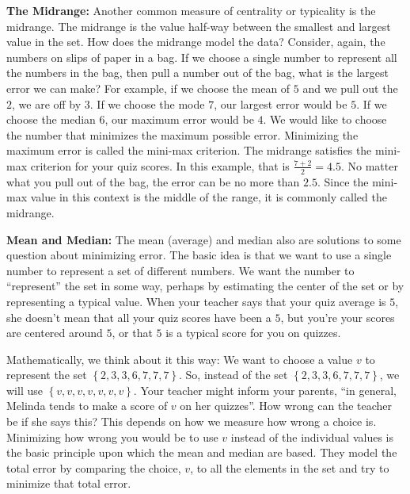 \documentclass[10pt,]{book}
\theoremstyle{ptxdefinitionnotitle}
\theoremstyle{ptxdefinitiontitle}
\numberwithin{equation}{section}
\begin{document}
\begin{example}[{.}]
\textbf{The Midrange:} Another common measure of centrality or typicality is the midrange. The midrange is the value half-way between the smallest and largest value in the set. How does the midrange model the data? Consider, again, the numbers on slips of paper in a bag. If we choose a single number to represent all the numbers in the bag, then pull a number out of the bag, what is the largest error we can make? For example, if we choose the mean of \(5\) and we pull out the \(2\), we are off by \(3\). If we choose the mode \(7\), our largest error would be \(5\). If we choose the median \(6\), our maximum error would be \(4\). We would like to choose the number that minimizes the maximum possible error. Minimizing the maximum error is called the mini-max criterion. The midrange satisfies the mini-max criterion for your quiz scores. In this example, that is \(\frac{7 + 2}{2} = 4.5\). No matter what you pull out of the bag, the error can be no more than \(2.5\). Since the mini-max value in this context is the middle of the range, it is commonly called the midrange. \\%
\par
\hypertarget{p-45}{}%
\textbf{Mean and Median:} The mean (average) and median also are solutions to some question about minimizing error. The basic idea is that we want to use a single number to represent a set of different numbers. We want the number to ``represent'' the set in some way, perhaps by estimating the center of the set or by representing a typical value. When your teacher says that your quiz average is \(5\), she doesn’t mean that all your quiz scores have been a \(5\), but you’re your scores are centered around \(5\), or that \(5\) is a typical score for you on quizzes. \\%
\par
\hypertarget{p-46}{}%
Mathematically, we think about it this way: We want to choose a value \(v\) to represent the set \(\left\{ 2, 3, 3, 6, 7, 7, 7 \right\}\). So, instead of the set \(\left\{ 2, 3, 3, 6, 7, 7, 7 \right\}\), we will use \(\left\{ v, v, v, v, v, v, v \right\}\). Your teacher might inform your parents, ``in general, Melinda tends to make a score of \(v\) on her quizzes''. How wrong can the teacher be if she says this? This depends on how we measure how wrong a choice is. Minimizing how wrong you would be to use \(v\) instead of the individual values is the basic principle upon which the mean and median are based. They model the total error by comparing the choice, \(v\), to all the elements in the set and try to minimize that total error. \\%

\end{example}
\end{document}
